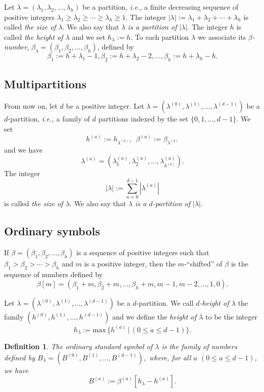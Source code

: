 \documentclass[10pt,a4paper,titlepage]{article}
\newtheorem{definition}[theorem]{Definition}
\newcommand{\el}{\lambda}
\newcommand{\eb}{\beta}
\newcommand{\ie}{\emph{i.e., }}
\begin{document}
Let $\el=(\el_1,\el_2,\ldots,\el_h)$ be a partition, \ie a finite decreasing sequence of positive integers
$\el_1 \geq \el_2 \geq \cdots \geq \el_h \geq 1.$
The integer
$|\el|:=\el_1+\el_2+\cdots+\el_h$
is called \emph{the size of $\el$}. We also say that $\lambda$ \emph{is a partition of }
$|\el|$.
The integer $h$ is called \emph{the height of $\el$} and we set $h_\el:=h$. To each partition $\el$ we associate its \emph{$\beta$-number}, $\eb_\el=(\eb_1,\eb_2,\ldots,\eb_h)$, defined by
$$\eb_1:=h+\el_1-1,\eb_2:=h+\el_2-2,\ldots,\eb_h:=h+\el_h-h.$$

\subsection*{\normalsize Multipartitions}

From now on,  let $d$ be a positive integer. Let $\el=(\el^{(0)},\el^{(1)},\ldots,\el^{(d-1)})$ be a $d$-partition, \ie a family of $d$ partitions indexed by the set $\{0,1,\ldots,d-1\}$. We set 
$$h^{(a)}:=h_{\el^{(a)}}, \,\,\, \eb^{(a)}:=\eb_{\el^{(a)}}$$
and we have
$$ \el^{(a)}=(\el_1^{(a)},\el_2^{(a)},\ldots,\el_{h^{(a)}}^{(a)}).$$
The integer
$$|\el|:=\sum_{a=0}^{d-1}|\el^{(a)}|$$
is called \emph{the size of $\el$}. We also say that $\lambda$ \emph{is a $d$-partition of}
$|\el|$.

\subsection*{\normalsize  Ordinary symbols}

If $\eb=(\eb_1,\eb_2,\ldots,\eb_h)$ is a sequence of positive integers such that $\eb_1>\eb_2>\cdots>\eb_h$ and $m$ is a positive integer, then the $m$-``shifted'' of $\eb$ is the sequence of numbers defined by
$$\eb[m]=(\eb_1+m,\eb_2+m,\ldots,\eb_h+m,m-1,m-2,\ldots,1,0).$$

Let  $\el=(\el^{(0)},\el^{(1)},\ldots,\el^{(d-1)})$ be a $d$-partition.  We call \emph{$d$-height of $\el$} the family $(h^{(0)},h^{(1)},\ldots,h^{(d-1)})$ and we define the 
 \emph{height of $\el$} to be the integer
$$h_\el:=\mathrm{max}\,\{h^{(a)} \,|\, (0 \leq a \leq d-1)\}.$$

\begin{definition}\label{ordinary standard symbol}
The ordinary standard symbol of $\el$ is the family of numbers defined by
$B_\el=(B^{(0)},B^{(1)},\ldots,B^{(d-1)}),$
where, for all $a$ $(0 \leq a \leq d-1)$, we have
$$B^{(a)}:=\eb^{(a)}[h_\el-h^{(a)}].$$
\end{definition}
\end{document}

